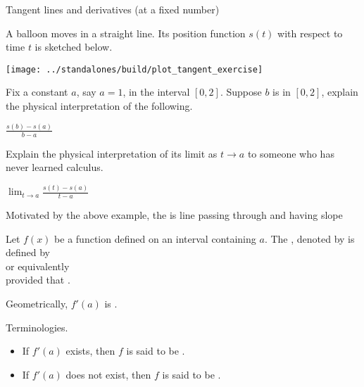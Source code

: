 \documentclass[../main.tex]{subfiles}
\begin{document}
\begin{lesson}{Tangent lines and derivatives (at a fixed number)}

  A balloon moves in a straight line. Its position function \(s(t)\) with respect to time \(t\) is sketched below. 

  \begin{center}
    \texttt{[image: ../standalones/build/plot\_tangent\_exercise]}
  \end{center}

  Fix a constant \(a\), say \(a = 1\), in the interval \([0,2]\). Suppose \(b\) is in \([0,2]\), explain the physical interpretation of the following. 

  \(\frac{s(b) - s(a)}{b - a}\)

  Explain the physical interpretation of its limit as \(t \to a\) to someone who has never learned calculus. 

  \(\lim_{t \to a} \frac{s(t) - s(a)}{t - a}\)

  Motivated by the above example, the  is \underline{\hspace{2cm}} line passing through \underline{\hspace{2in}} and having slope 
  \clearpage

  \begin{mdframed}[style=simple]
    Let \(f(x)\) be a function defined on an \underline{\hspace{1in}} interval containing \(a\). The , denoted by  is defined by
    \begin{equation}\label{eq:def-derivative-1}
    \end{equation}
    or equivalently 
    \begin{equation}\label{eq:def-derivative-2}
    \end{equation}
    provided that \underline{\hspace{2in}}.

  \end{mdframed}

  \faStar{} Geometrically, \(f'(a)\) is \underline{\hspace{5in}}.

  Terminologies. 
  \begin{itemize}
    \item If \(f'(a)\) exists, then \(f\) is said to be .
    \item If \(f'(a)\) does not exist, then \(f\) is said to be .
  \end{itemize}


\end{lesson}
\end{document}
